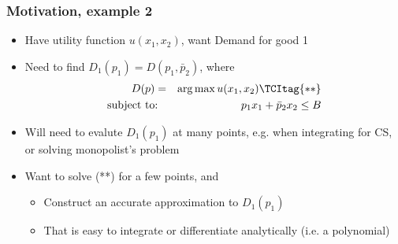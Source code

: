 \documentclass[bigger]{beamer}
\begin{document}
\begin{frame}%
\frametitle{Motivation, example 2}

\begin{itemize}
\item Have utility function $u(x_{1},x_{2})$, want Demand for good 1

\item Need to find $D_{1}(p_{1})=D(p_{1},\bar{p}_{2})$, where 
\begin{eqnarray}
D(p) &=&\arg \max u(x_{1},x_{2})  \TCItag{**} \\
\text{subject to} &\text{:}&p_{1}x_{1}+\bar{p}_{2}x_{2}\leq B  \notag
\end{eqnarray}

\item Will need to evalute $D_{1}(p_{1})$ at many points, \newline
e.g. when integrating for CS, or solving monopolist's problem

\item Want to solve (**) for a few points, and

\begin{itemize}
\item Construct an accurate approximation to $D_{1}(p_{1})$

\item That is easy to integrate or differentiate analytically \newline
(i.e. a polynomial)
\end{itemize}
\end{itemize}

\end{frame}%
\end{document}

